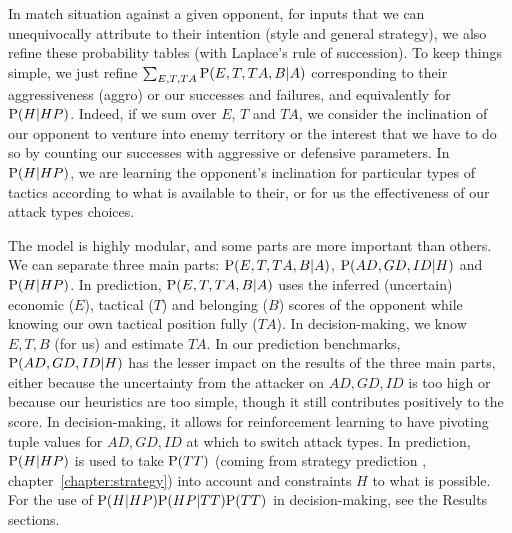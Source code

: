 In match situation against a given opponent, for inputs that we can unequivocally attribute to their intention (style and general strategy), we also refine these probability tables (with Laplace's rule of succession). To keep things simple, we just refine $\sum_{E,T,TA}\mathrm{P}(E,T,TA,B|A)$ corresponding to their aggressiveness (aggro) or our successes and failures, and equivalently for $\mathrm{P}(H|HP)$. Indeed, if we sum over $E$, $T$ and $TA$, we consider the inclination of our opponent to venture into enemy territory or the interest that we have to do so by counting our successes with aggressive or defensive parameters. In $\mathrm{P}(H|HP)$, we are learning the opponent's inclination for particular types of tactics according to what is available to their, or for us the effectiveness of our attack types choices.

The model is highly modular, and some parts are more important than others. We can separate three main parts: $\mathrm{P}(E,T,TA,B|A)$, $\mathrm{P}(AD,GD,ID|H)$ and $\mathrm{P}(H|HP)$. In prediction, $\mathrm{P}(E,T,TA,B|A)$ uses the inferred (uncertain) economic ($E$), tactical ($T$) and belonging ($B$) scores of the opponent while knowing our own tactical position fully ($TA$). In decision-making, we know $E,T,B$ (for us) and estimate $TA$. In our prediction benchmarks, $\mathrm{P}(AD,GD,ID|H)$ has the lesser impact on the results of the three main parts, either because the uncertainty from the attacker on $AD,GD,ID$ is too high or because our heuristics are too simple, though it still contributes positively to the score. In decision-making, it allows for reinforcement learning to have pivoting tuple values for $AD,GD,ID$ at which to switch attack types. In prediction, $\mathrm{P}(H|HP)$ is used to take $\mathrm{P}(TT)$ (coming from strategy prediction \cite{SYNNAEVE:StratPred}, chapter~\ref{chapter:strategy}) into account and constraints $H$ to what is possible. For the use of $\mathrm{P}(H|HP)\mathrm{P}(HP|TT)\mathrm{P}(TT)$ in decision-making, see the Results sections.

